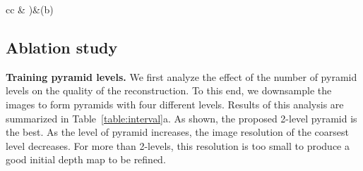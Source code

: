 \begin{table*}[!t]
\footnotesize
\begin{center}
\begin{tabular}{cc}
&
 \a)&(b)
\end{tabular}
\end{center}
\vspace{-0.55cm}
\caption{Parameter sensitivity on DTU dataset. a) Accuracy as a function of the number of pyramid levels. b) Accuracy as a function of the interval setting.}\label{table:interval}
\vspace{-0.4cm}
\end{table*}

\subsection{Ablation study}
\noindent\textbf{Training pyramid levels.} We first analyze the effect of the number of pyramid levels on the quality of the reconstruction. To this end, we downsample the images to form pyramids with four different levels. Results of this analysis are summarized in Table~\ref{table:interval}a. As shown, the proposed 2-level pyramid is the best. As the level of pyramid increases, the image resolution of the coarsest level decreases. For more than 2-levels, this resolution is too small to produce a good initial depth map to be refined.


